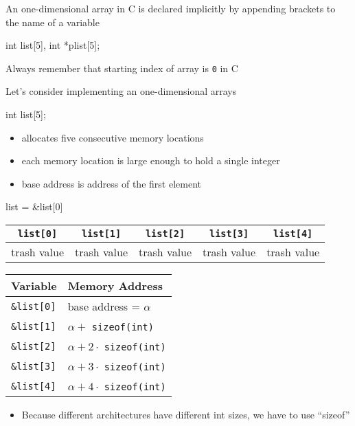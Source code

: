 \documentclass[newPxFont,sthlmFooter,nooffset]{beamer}
\begin{document}
\begin{frame}
An one-dimensional array in C is declared implicitly by appending brackets to the name of a variable

\begin{codedef}
  int list[5], int *plist[5];
\end{codedef}

Always remember that starting index of array is \texttt{0} in C  

\framebreak
Let's consider implementing an one-dimensional arrays

\begin{codedefnb}
int list[5];
\end{codedefnb}

\begin{itemize}
\item allocates five consecutive memory locations
\item each memory location is large enough to hold a single integer
\item base address is address of the first element
\end{itemize}

\begin{codedefnb}
list = &list[0]
\end{codedefnb}
\begin{center}
	\begin{tabular}{| c | c | c | c | c |}
		\hline
		\texttt{list[0]} & \texttt{list[1]} & \texttt{list[2]} & \texttt{list[3]} & \texttt{list[4]} \\
		\hline
		 trash value & trash value & trash value & trash value & trash value \\
		\hline
	\end{tabular}
\end{center}

\framebreak
  
  \begin{tabular}{l  l}
    Variable & Memory Address \\ \hline
\texttt{\&list[0]} & base address = $\alpha$ \\
\texttt{\&list[1]} & $\alpha +$ \texttt{sizeof(int)}\\
\texttt{\&list[2]} & $\alpha + 2 \cdot$ \texttt{sizeof(int)}\\
\texttt{\&list[3]} & $\alpha + 3 \cdot$ \texttt{sizeof(int)}\\
\texttt{\&list[4]} & $\alpha + 4 \cdot$ \texttt{sizeof(int)}\\
  \end{tabular}
\begin{itemize}
	\item Because different architectures have different int sizes, we have to use ``sizeof''
\end{itemize}


\end{frame}
\end{document}
